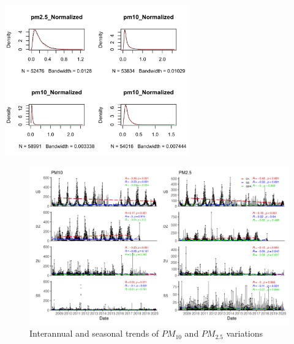 \documentclass[
  11pt,
]{article}
\begin{document}
\includegraphics[width=3.125in,height=\textheight,keepaspectratio]{images/figure_2c.png}
\newpage

\begin{figure}
\centering
\includegraphics[width=6.25in,height=\textheight,keepaspectratio]{images/figure_8_supplement.png}
\caption{Interannual and seasonal trends of \(PM_{10}\) and \(PM_{2.5}\)
variations}
\end{figure}
\end{document}
